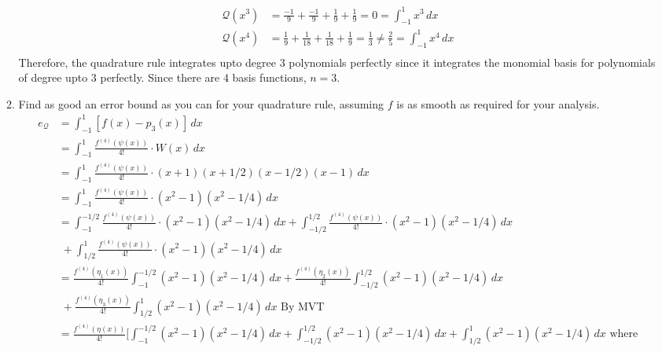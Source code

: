 \documentclass{article}
\begin{document}
\begin{enumerate}
\begin{enumerate}
\begin{align*}
                \mathcal{Q}(x^3) &= \frac{-1}{9} + \frac{-1}{9} + \frac{1}{9} + \frac{1}{9} = 0 = \int_{-1}^1 x^3 \, dx\\
                \mathcal{Q}(x^4) &= \frac{1}{9} + \frac{1}{18} + \frac{1}{18} + \frac{1}{9} = \frac{1}{3} \not = \frac{2}{5} = \int_{-1}^1 x^4 \, dx \\
            \end{align*} 
            Therefore, the quadrature rule integrates upto degree 3 polynomials perfectly since it integrates the monomial basis for polynomials of degree upto 3 perfectly. Since there are 4 basis functions, $n = 3$.
            \item Find as good an error bound as you can for your quadrature rule, assuming $f$ is as smooth as required for your analysis.
            \begin{align*}
                e_{\mathcal{Q}} &= \int_{-1}^1 [f(x) - p_3(x)] \, dx \\
                &= \int_{-1}^1 \frac{f^{(4)}(\psi(x))}{4!} \cdot W(x) \, dx \\
                &= \int_{-1}^1 \frac{f^{(4)}(\psi(x))}{4!} \cdot (x + 1)(x + 1/2)(x - 1/2)(x - 1) \, dx \\
                &= \int_{-1}^1 \frac{f^{(4)}(\psi(x))}{4!} \cdot (x^2 - 1)(x^2 - 1/4) \, dx \\
                &= \int_{-1}^{-1/2} \frac{f^{(4)}(\psi(x))}{4!} \cdot (x^2 - 1)(x^2 - 1/4) \, dx + \int_{-1/2}^{1/2} \frac{f^{(4)}(\psi(x))}{4!} \cdot (x^2 - 1)(x^2 - 1/4) \, dx \\
                &\; + \int_{1/2}^{1} \frac{f^{(4)}(\psi(x))}{4!} \cdot (x^2 - 1)(x^2 - 1/4) \, dx \\
                &= \frac{f^{(4)}(\eta_1(x))}{4!} \int_{-1}^{-1/2} (x^2 - 1)(x^2 - 1/4) \, dx +\frac{f^{(4)}(\eta_2(x))}{4!} \int_{-1/2}^{1/2}  (x^2 - 1)(x^2 - 1/4) \, dx \\
                &\; +\frac{f^{(4)}(\eta_3(x))}{4!}  \int_{1/2}^{1} (x^2 - 1)(x^2 - 1/4) \, dx \text{ By MVT}\\
                &= \frac{f^{(4)}(\eta(x))}{4!} \Big[ \int_{-1}^{-1/2} (x^2 - 1)(x^2 - 1/4) \, dx +\int_{-1/2}^{1/2}  (x^2 - 1)(x^2 - 1/4) \, dx +\int_{1/2}^{1} (x^2 - 1)(x^2 - 1/4) \, dx \text{ where}\\
            \end{align*} 
        \end{enumerate}
\end{enumerate}
\end{document}
